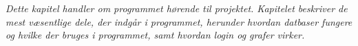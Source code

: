 \textit{Dette kapitel handler om programmet hørende til projektet. Kapitelet beskriver de mest væsentlige dele, der indgår i programmet, herunder hvordan datbaser fungere og hvilke der bruges i programmet, samt hvordan login og grafer virker.}